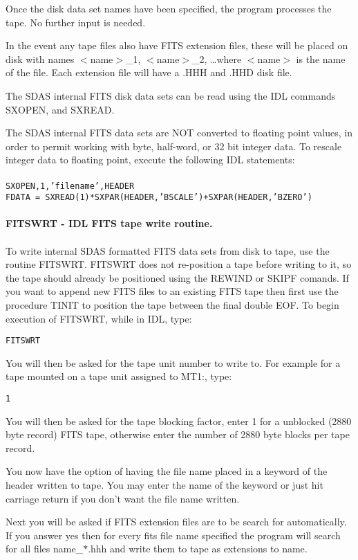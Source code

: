 Once the disk data set names have been specified, the program processes the
tape.  No further input is needed.

In the event any tape files also have FITS extension files, these
will be placed on disk with names $<$name$>$\_1, $<$name$>$\_2, \ldots where
$<$name$>$ is the name of the file.  Each extension file will have
a .HHH and .HHD disk file.

The SDAS internal FITS disk data sets can be read using the IDL commands SXOPEN,
and SXREAD.
 
The SDAS internal FITS data sets are NOT converted to floating point values, in
order to permit working with byte, half-word, or 32 bit integer data.
To rescale integer data to floating point, execute the following IDL
statements: \\
\\
{\tt SXOPEN,1,'filename',HEADER} \\
{\tt FDATA = SXREAD(1)*SXPAR(HEADER,'BSCALE')+SXPAR(HEADER,'BZERO')} \\
\\
{\bf FITSWRT - IDL FITS tape write routine.} \\
\\
To write internal SDAS formatted FITS data sets from disk to tape, use the
routine FITSWRT.  FITSWRT does not re-position a tape before writing to it,
so the tape should already be positioned using the REWIND or SKIPF comands.
If you want to append new FITS files to an existing FITS tape then first 
use the
procedure TINIT to position the tape between the final double EOF.
To begin execution of FITSWRT, while in IDL, type:
\begin{center}
{\tt FITSWRT}
\end{center}
You will then be asked for the tape unit number to write to.  For example
for a tape mounted on a tape unit assigned to MT1:, type: 
\begin{center}
{\tt 1} 
\end{center}
You will then be asked for the tape blocking factor,  enter 1
for a unblocked (2880 byte record) FITS tape, otherwise enter
the number of 2880 byte blocks per tape record.

You now have the option of having the file name placed in a
keyword of the header written to tape.  You may enter the name of
the keyword or just hit carriage return if you don't want the
file name written.

Next you will be asked if FITS extension files are to be search for
automatically. If you answer yes then for every fits file name
specified the program will search for all files name\_$\ast$.hhh and
write them to tape as extensions to name.

